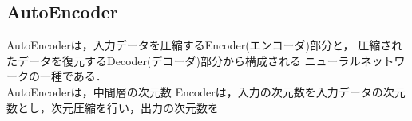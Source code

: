 \subsection{AutoEncoder}
AutoEncoderは，入力データを圧縮するEncoder(エンコーダ)部分と，
圧縮されたデータを復元するDecoder(デコーダ)部分から構成される
ニューラルネットワークの一種である．\\
AutoEncoderは，中間層の次元数
Encoderは，入力の次元数を入力データの次元数とし，次元圧縮を行い，出力の次元数を

\newpage